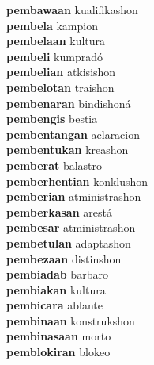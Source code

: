 \textbf{pembawaan } kualifikashon \\
\textbf{pembela } kampion \\
\textbf{pembelaan } kultura \\
\textbf{pembeli } kumpradó \\
\textbf{pembelian } atkisishon \\
\textbf{pembelotan } traishon \\
\textbf{pembenaran } bindishoná \\
\textbf{pembengis } bestia \\
\textbf{pembentangan } aclaracion \\
\textbf{pembentukan } kreashon \\
\textbf{pemberat } balastro \\
\textbf{pemberhentian } konklushon \\
\textbf{pemberian } atministrashon \\
\textbf{pemberkasan } arestá \\
\textbf{pembesar } atministrashon \\
\textbf{pembetulan } adaptashon \\
\textbf{pembezaan } distinshon \\
\textbf{pembiadab } barbaro \\
\textbf{pembiakan } kultura \\
\textbf{pembicara } ablante \\
\textbf{pembinaan } konstrukshon \\
\textbf{pembinasaan } morto \\
\textbf{pemblokiran } blokeo \\
